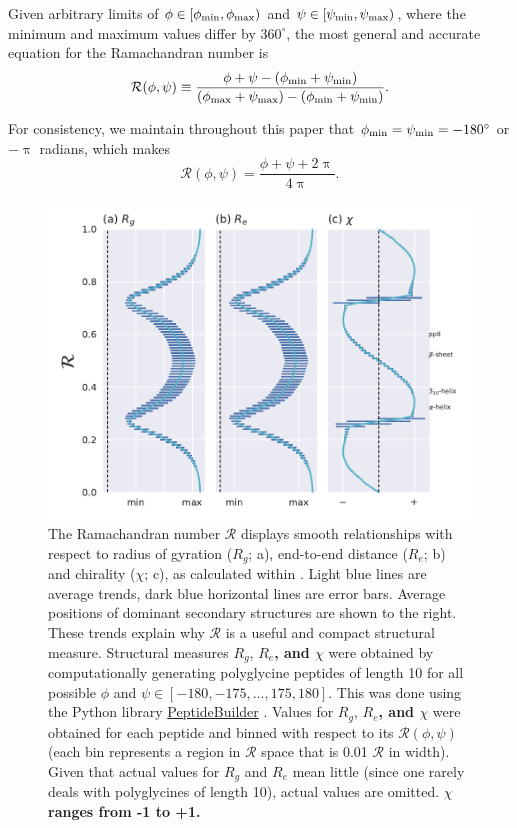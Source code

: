 \documentclass[fleqn,10pt,lineno]{wlpeerj} %
\newcommand{\n}[1]{{\textbf{\color{red}#1}}}
\newcommand{\rr}{$\mathcal{R}$\xspace}
\begin{document}

Given arbitrary limits of $\phi \in [\phi_{\rm min},\phi_{\rm max})$ and $\psi \in [\psi_{\rm min},\psi_{\rm max})$, where the minimum and maximum values differ by $360^\circ$, the most general and accurate equation for the Ramachandran number is
\begin{equation}
{\mathcal{R}}(\phi,\psi) \equiv  \frac{\phi+\psi-(\phi_{\rm min}+\psi_{\rm min})}{(\phi_{\rm max}+\psi_{\rm max})-(\phi_{\rm min}+\psi_{\rm min})}.
\label{ramaGeneral}
\end{equation}

For consistency, we maintain throughout this paper that $\phi_{\rm min} = \psi_{\rm min} = -180^\circ$ or $-\uppi$ radians, which makes 
\begin{equation}
\mathcal{R}(\phi,\psi) = \frac{\phi+\psi+2\uppi}{4\uppi}.\label{eqn:rama}
\end{equation}

\begin{figure}[t!]
\begin{adjustwidth}{-1in}{0in} %
\centering
\includegraphics[width=0.6\linewidth]{backmap_fig4.pdf}
\caption{The Ramachandran number \rr displays smooth relationships with respect to radius of gyration ($R_g$; a), end-to-end distance ($R_e$; b) and chirality ($\chi$; c), as calculated within \cite{Mannige2017}. Light blue lines are average trends, dark blue horizontal lines are error bars. Average positions of dominant secondary structures are shown to the right. These trends explain why \rr is a useful and compact structural measure. Structural measures $R_g$, $R_e$\n{, and $\chi$} were obtained by computationally generating polyglycine peptides of length 10 for all possible $\phi$ and $\psi \in [-180,-175,\ldots,175,180]$. This was done using the Python library \href{https://github.com/mtien/PeptideBuilder}{PeptideBuilder} \citep{Tien2013}. Values for $R_g$, $R_e$\n{, and $\chi$} were obtained for each peptide and binned with respect to its {$\mathcal{R}(\phi,\psi)$} (each bin represents a region in \rr space that is 0.01 \rr in width). Given that actual values for $R_g$ and $R_e$ mean little (since one rarely deals with polyglycines of length 10), actual values are omitted. \n{$\chi$ ranges from -1 to +1.} \label{fig:r_smooth}} 
\end{adjustwidth}
\end{figure}
\end{document}
